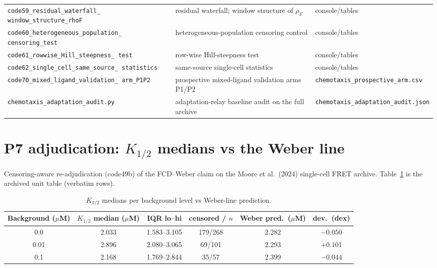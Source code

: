 \documentclass[11pt]{article}
\begin{document}
\begin{longtable}{p{4.8cm} p{6.8cm} p{4.2cm}}
\texttt{code59\_\allowbreak{}residual\_\allowbreak{}waterfall\_\allowbreak{} window\_\allowbreak{}structure\_\allowbreak{}rhoF} & residual waterfall; window structure of $\rho_F$ & console/tables \\
\texttt{code60\_\allowbreak{}heterogeneous\_\allowbreak{}population\_\allowbreak{} censoring\_\allowbreak{}test} & heterogeneous-population censoring control & console/tables \\
\texttt{code61\_\allowbreak{}rowwise\_\allowbreak{}Hill\_\allowbreak{}steepness\_\allowbreak{} test} & row-wise Hill-steepness test & console/tables \\
\texttt{code62\_\allowbreak{}single\_\allowbreak{}cell\_\allowbreak{}same\_\allowbreak{}source\_\allowbreak{} statistics} & same-source single-cell statistics & console/tables \\
\texttt{code70\_\allowbreak{}mixed\_\allowbreak{}ligand\_\allowbreak{}validation\_\allowbreak{} arm\_\allowbreak{}P1P2} & prospective mixed-ligand validation arms P1/P2 & \texttt{chemotaxis\_\allowbreak{}prospective\_\allowbreak{}arm.csv} \\
\texttt{chemotaxis\_\allowbreak{}adaptation\_\allowbreak{}audit.py} & adaptation-relay baseline audit on the full archive & \texttt{chemotaxis\_\allowbreak{}adaptation\_\allowbreak{}audit.json} \\
\bottomrule
\end{longtable}

\section{P7 adjudication: $K_{1/2}$ medians vs the Weber line}

Censoring-aware re-adjudication (code49b) of the FCD--Weber claim on the
Moore et al.\ (2024) single-cell FRET archive. Table~\ref{tab:p7} is the
archived unit table (verbatim rows).

\begin{table}[h]
\centering\small
\caption{$K_{1/2}$ medians per background level vs Weber-line prediction.}
\label{tab:p7}
\begin{tabular}{cccccc}
\toprule
Background ($\mu$M) & $K_{1/2}$ median ($\mu$M) & IQR lo--hi & censored / $n$ & Weber pred.\ ($\mu$M) & dev.\ (dex) \\
\midrule
0.0  & 2.033 & 1.583--3.105 & 179/268 & 2.282 & $-0.050$ \\
0.01 & 2.896 & 2.080--3.065 & 69/101  & 2.293 & $+0.101$ \\
0.1  & 2.168 & 1.769--2.844 & 35/57   & 2.399 & $-0.044$ \\
\bottomrule
\end{tabular}
\end{table}
\end{document}
